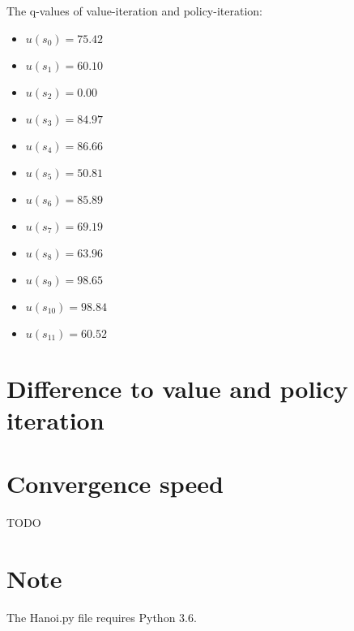 \documentclass[a4paper]{article}
\begin{document}
The q-values of value-iteration and policy-iteration:
\begin{multicols}{2}
\begin{itemize}
\item $u(s_0) = 75.42 $
\item $u(s_1) = 60.10 $
\item $u(s_2) = 0.00 $
\item $u(s_3) = 84.97 $
\item $u(s_4) = 86.66 $
\item $u(s_5) = 50.81 $
\item $u(s_6) = 85.89 $
\item $u(s_7) = 69.19 $
\item $u(s_8) = 63.96 $
\item $u(s_9) = 98.65 $
\item $u(s_{10}) = 98.84 $
\item $u(s_{11}) = 60.52 $
\end{itemize}
\end{multicols}

\section{Difference to value and policy iteration}

\section{Convergence speed}
TODO

\section{Note}
The Hanoi.py file requires Python 3.6.
\end{document}
